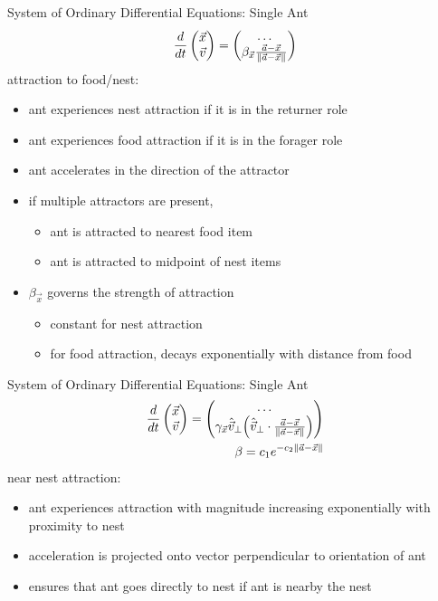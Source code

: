 \begin{frame}{System of Ordinary Differential Equations: Single Ant}
\begin{align*}
\frac{d}{dt} \begin{pmatrix}\vec{x}\\\vec{v}\end{pmatrix} = \begin{pmatrix}\hdots \\ \beta_{\vec{x}} \frac{\vec{a} - \vec{x}}{\lVert\vec{a} - \vec{x}\rVert} \end{pmatrix}
\end{align*}
\alert{attraction to food/nest:}
\begin{itemize}
	\item ant experiences nest attraction if it is in the returner role
    \item ant experiences food attraction if it is in the forager role
	\item ant accelerates in the direction of the attractor
    \item if multiple attractors are present,
    \begin{itemize}
		\item ant is attracted to nearest food item
        \item ant is attracted to midpoint of nest items
    \end{itemize}
    \item $\beta_{\vec{x}}$ governs the strength of attraction
    \begin{itemize}
    	\item constant for nest attraction
        \item for food attraction, decays exponentially with distance from food
    \end{itemize}
\end{itemize}
\end{frame}

\begin{frame}{System of Ordinary Differential Equations: Single Ant}
\begin{align*}
\frac{d}{dt} \begin{pmatrix}\vec{x}\\\vec{v}\end{pmatrix} = \begin{pmatrix}
\hdots \\
\gamma_{\vec{x}} \hat{\vec{v}}_{\perp} \Big( \hat{\vec{v}}_{\perp} \cdot \frac{\vec{a} - \vec{x}}{\lVert\vec{a} - \vec{x}\rVert} \Big)
\end{pmatrix}  \\
\beta = c_1e^{-c_2\lVert\vec{a} - \vec{x}\rVert}
\end{align*}
\alert{near nest attraction:}
\begin{itemize}
	\item ant experiences attraction with magnitude increasing exponentially with proximity to nest
    \item acceleration is projected onto vector perpendicular to orientation of ant
	\item ensures that ant goes directly to nest if ant is nearby the nest
\end{itemize}
\end{frame}

